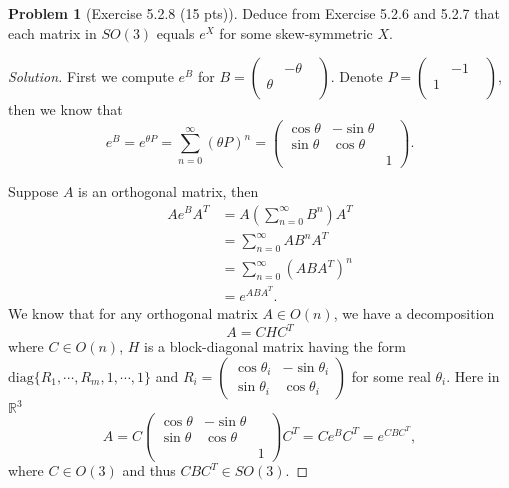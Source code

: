 \documentclass{article}
\theoremstyle{definition}
\newtheorem{problem}{Problem}
\theoremstyle{plain}
\begin{document}
\begin{problem}[Exercise 5.2.8 (15 pts)]Deduce from Exercise 5.2.6 and 5.2.7 that each matrix in $SO(3)$ equals $e^X$ for some skew-symmetric $X$.
\end{problem}
\begin{adjustwidth}{0.7cm}{}
\color{blue}
\begin{proof}[Solution]
First we compute $e^B$ for $B=\begin{pmatrix}&-\theta&\\ \theta&&\\ &&\end{pmatrix}$. Denote $P=\begin{pmatrix}&-1&\\ 1&&\\ &&\end{pmatrix}$, then we know that
\begin{displaymath}
e^B=e^{\theta P}=\sum_{n=0}^{\infty}(\theta P)^n=\begin{pmatrix}\cos\theta&-\sin\theta&\\ \sin\theta&\cos\theta&\\ &&1\end{pmatrix}.
\end{displaymath}\par
Suppose $A$ is an orthogonal matrix, then
\begin{align*}
Ae^BA^T&=A\left(\sum_{n=0}^{\infty}B^n\right)A^T\\
&=\sum_{n=0}^{\infty}AB^nA^T\\
&=\sum_{n=0}^{\infty}(ABA^T)^n\\
&=e^{ABA^T}.
\end{align*}
We know that for any orthogonal matrix $A\in O(n)$, we have a decomposition
\begin{displaymath}
A=CHC^T
\end{displaymath}
where $C\in O(n)$, $H$ is a block-diagonal matrix having the form $\mathrm{diag}\{R_1,\cdots,R_m,1,\cdots,1\}$ and $R_i=\begin{pmatrix}\cos\theta_i&-\sin\theta_i\\ \sin\theta_i&\cos\theta_i\end{pmatrix}$ for some real $\theta_i$. Here in $\mathbb{R}^3$
\begin{displaymath}
A=C\begin{pmatrix}\cos\theta&-\sin\theta&\\ \sin\theta&\cos\theta&\\ &&1\end{pmatrix}C^T=Ce^BC^T=e^{CBC^T},
\end{displaymath}
where $C\in O(3)$ and thus $CBC^T\in SO(3)$.
\color{black}
\end{proof}
\end{adjustwidth}
\end{document}
